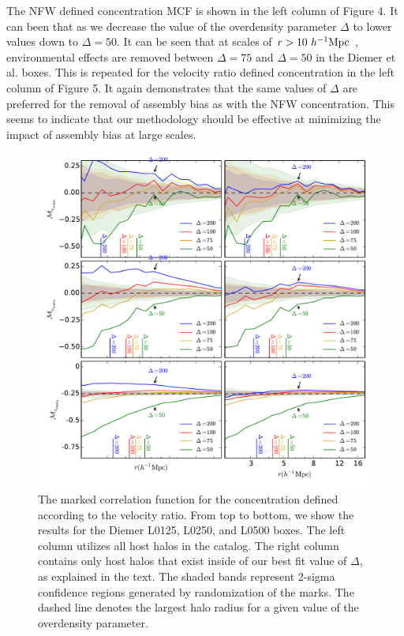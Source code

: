 \documentclass[usenatbib,usegraphicx,letterpaper]{mn2e}
\begin{document}
The NFW defined concentration MCF is shown in the left column of Figure 4. It can been that as we decrease the value of the overdensity parameter $\Delta$ to lower values down to $\Delta = 50$. It can be seen that at scales of $r > 10 \ h^{-1}\mathrm{Mpc}~$, environmental effects are removed between $\Delta = 75$ and $\Delta = 50$ in the Diemer et al. boxes. This is repeated for the velocity ratio defined concentration in the left column of Figure 5. It again demonstrates that the same values of $\Delta$ are preferred for the removal of assembly bias as with the NFW concentration. This seems to indicate that our methodology should be effective at minimizing the impact of assembly bias at large scales.

\begin{figure}
	\centering
	\includegraphics[width=\textwidth]{all_mcf_cvratio_z00_hostsvmatch.pdf}
	\caption{The marked correlation function for the concentration defined according to the velocity ratio. From top to bottom, we show the results for the Diemer L0125, L0250, and L0500 boxes. The left column utilizes all host halos in the catalog. The right column contains only host halos that exist inside of our best fit value of $\Delta$, as explained in the text. The shaded bands represent 2-sigma confidence regions generated by randomization of the marks. The dashed line denotes the largest halo radius for a given value of the overdensity parameter.}
\end{figure}
\end{document}
